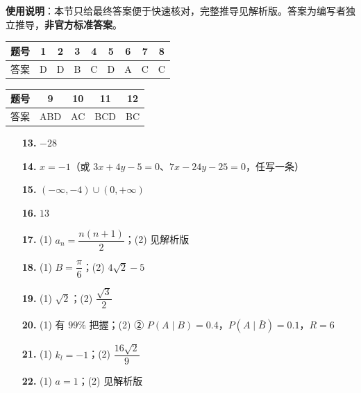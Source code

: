 
\begin{gknotice}
\textbf{使用说明}：本节只给最终答案便于快速核对，完整推导见解析版。答案为编写者独立推导，\textbf{非官方标准答案}。
\end{gknotice}

\begin{center}\begin{tabular}{ccccccccc}
\toprule
题号 & 1 & 2 & 3 & 4 & 5 & 6 & 7 & 8 \\
\midrule
答案 & D & D & B & C & D & A & C & C \\
\bottomrule
\end{tabular}\end{center}

\begin{center}\begin{tabular}{ccccc}
\toprule
题号 & 9 & 10 & 11 & 12 \\
\midrule
答案 & ABD & AC & BCD & BC \\
\bottomrule
\end{tabular}\end{center}

\begin{itemize}[leftmargin=2.6em]
  \item[\textbf{13.}] $-28$
  \item[\textbf{14.}] $x=-1$（或 $3x+4y-5=0$、$7x-24y-25=0$，任写一条）
  \item[\textbf{15.}] $(-\infty,-4)\cup(0,+\infty)$
  \item[\textbf{16.}] $13$
\end{itemize}

\begin{itemize}[leftmargin=2.6em]
  \item[\textbf{17.}] (1) $a_n=\dfrac{n(n+1)}2$；(2) 见解析版
  \item[\textbf{18.}] (1) $B=\dfrac\pi6$；(2) $4\sqrt2-5$
  \item[\textbf{19.}] (1) $\sqrt2$；(2) $\dfrac{\sqrt3}2$
  \item[\textbf{20.}] (1) 有 $99\%$ 把握；(2) ② $P(A\mid B)=0.4$，$P(A\mid\bar B)=0.1$，$R=6$
  \item[\textbf{21.}] (1) $k_l=-1$；(2) $\dfrac{16\sqrt2}9$
  \item[\textbf{22.}] (1) $a=1$；(2) 见解析版
\end{itemize}
